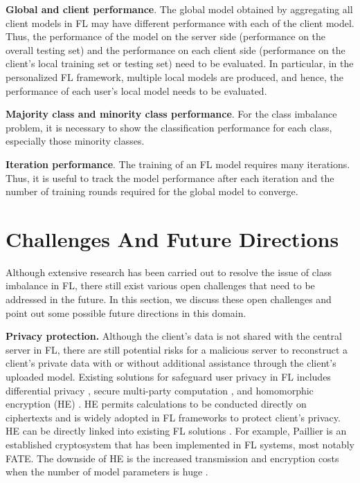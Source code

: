 \documentclass[10pt,journal,compsoc]{IEEEtran}
\begin{document}
\textbf{Global and client performance}. The global model obtained by aggregating all client models in FL may have different performance with each of the client model. Thus, the performance of the model on the server side (performance on the overall testing set) and the performance on each client side (performance on the client's local training set or testing set) need to be evaluated. In particular, in the personalized FL framework, multiple local models are produced, and hence, the performance of each user's local model needs to be evaluated.

\textbf{Majority class and minority class performance}. For the class imbalance problem, it is necessary to show the classification performance for each class, especially those minority classes.

\textbf{Iteration performance}. The training of an FL model requires many iterations. Thus, it is useful to track the model performance after each iteration and the number of training rounds required for the global model to converge.
\vspace{-0.2cm}

\section{Challenges And Future Directions}
\label{sec:challenges}
Although extensive research has been carried out to resolve the issue of class imbalance in FL, there still exist various open challenges that need to be addressed in the future. In this section, we discuss these open challenges and point out some possible future directions in this domain.

\textbf{Privacy protection.}
Although the client's data is not shared with the central server in FL, there are still potential risks for a malicious server to reconstruct a client's private data with or without additional assistance through the client's uploaded model. Existing solutions for safeguard user privacy in FL includes differential privacy \cite{huang2020dp}, secure multi-party computation \cite{du2004privacy} \cite{mohassel2017secureml}, and homomorphic encryption (HE) \cite{yuan2013privacy}. HE permits calculations to be conducted directly on ciphertexts and is widely adopted in FL frameworks to protect client's privacy. HE can be directly linked into existing FL solutions \cite{hardy2017private} \cite{liu2020secure} \cite{zhang2020batchcrypt}. For example, Paillier \cite{paillier1999public} is an established cryptosystem that has been implemented in FL systems, most notably FATE. The downside of HE is the increased transmission and encryption costs when the number of model parameters is huge \cite{zhang2020batchcrypt} \cite{zhang2021dubhe}.
\end{document}
